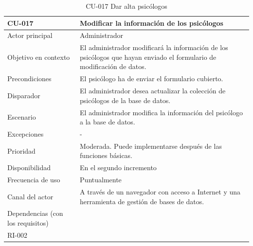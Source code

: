 \begin{table}[htpb]
\centering
\begin{tabularx}{\textwidth}{|X|X|}
\hline
\textbf{CU-017}                            & \textbf{Modificar la información de los psicólogos                                                                           } \\ \hline
Actor principal                   & Administrador                                                                                  \\ \hline
Objetivo en contexto              & El administrador modificará la información de los psicólogos que hayan enviado el formulario de modificación de datos.    \\ \hline
Precondiciones                    & El psicólogo ha de enviar el formulario cubierto.          \\ \hline
Disparador                        & El administrador desea actualizar la colección de psicólogos de la base de datos.              \\ \hline
Escenario                         & El administrador modifica la información del psicólogo a la base de datos.                        \\ \hline
Excepciones                       & -                                                                                              \\ \hline
Prioridad                         & Moderada. Puede implementarse después de las funciones básicas.                                \\ \hline
Disponibilidad                    & En el segundo incremento                                                                       \\ \hline
Frecuencia de uso                 & Puntualmente                                                                                   \\ \hline
Canal del actor                   & A través de un navegador con acceso a Internet y una herramienta de gestión de bases de datos. \\ \hline
Dependencias (con los requisitos) & \begin{tabular}[c]{@{}l@{}}RI-003\\ RI-002\end{tabular}                                        \\ \hline
\end{tabularx}
\caption{CU-017 Dar alta psicólogos}                          
\end{table}

